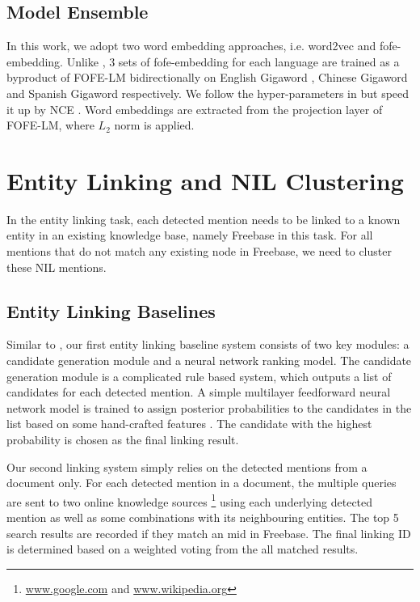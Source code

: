 \documentclass[11pt]{article}
\begin{document}
\subsection{Model Ensemble}

In this work, we adopt two word embedding approaches, i.e. word2vec \cite{mikolov2013distributed} and fofe-embedding. 
Unlike \cite{joseph2017embed}, 3 sets of fofe-embedding for each language are trained as a byproduct of FOFE-LM \cite{zhang2015fixed,zhang2015arxiv} bidirectionally on English Gigaword \cite{parker2011english}, Chinese Gigaword \cite{graff2005chinese} and Spanish Gigaword \cite{mendonca2009spanish} respectively. 
We follow the hyper-parameters in \cite{zhang2015fixed,zhang2015arxiv} but speed it up by NCE \cite{gutmann2010noise}. Word embeddings are extracted from the projection layer of FOFE-LM, where $L_2$ norm is applied. 

\section{Entity Linking and NIL Clustering}

In the entity linking task, each detected mention needs to be linked to a known entity in an existing
knowledge base, namely Freebase in this task. For all mentions that do not match any existing node in Freebase, we need to cluster these NIL mentions.

\subsection{Entity Linking Baselines}

Similar to \cite{kbp2016iflytek}, our first entity linking baseline system consists of two key modules: a candidate generation module and a neural network ranking model. The candidate generation module is a complicated rule based system, which outputs a list of candidates for each detected mention. A simple multilayer feedforward neural network model is trained to assign posterior probabilities to the candidates in the list based on some hand-crafted features \cite{kbp2016iflytek}. The candidate with the highest probability is chosen as the final linking result. 

Our second linking system simply relies on the detected mentions from a document only. For each detected mention in a document, the multiple queries are sent to two online knowledge sources \footnote{\url{www.google.com} and \url{www.wikipedia.org}} using each underlying detected mention as well as some combinations with its neighbouring entities. The top 5 search results are recorded if they match an mid in Freebase. The final linking ID is determined based on a weighted voting from the all matched results.
\end{document}
